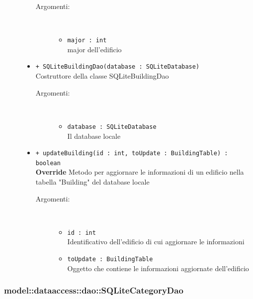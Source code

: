 \documentclass[../DefinizioneDiProdotto.tex]{subfiles}
\begin{document}
\begin{description}
\begin{itemize}
 \begin{description}
\item[Argomenti:] \
\begin{itemize}
\item \texttt{major : int}\\
major dell'edificio\end{itemize}
\end{description}
\item \texttt{+ SQLiteBuildingDao(database : SQLiteDatabase)}\\
Costruttore della classe SQLiteBuildingDao
 \begin{description}
\item[Argomenti:] \
\begin{itemize}
\item \texttt{database : SQLiteDatabase}\\
Il database locale\end{itemize}
\end{description}
\item \texttt{+ updateBuilding(id : int, toUpdate : BuildingTable) : boolean}\\
\textbf{Override} Metodo per aggiornare le informazioni di un edificio nella tabella "Building" del database locale
 \begin{description}
\item[Argomenti:] \
\begin{itemize}
\item \texttt{id : int}\\
Identificativo dell'edificio di cui aggiornare le informazioni\item \texttt{toUpdate : BuildingTable}\\
Oggetto che contiene le informazioni aggiornate dell'edificio\end{itemize}
\end{description}
\end{itemize}
\end{description}

\subsubsection{model::dataaccess::dao::SQLiteCategoryDao}
\end{document}

